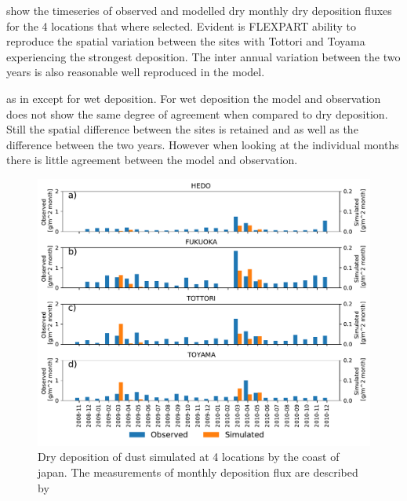  show the timeseries of observed and modelled dry monthly dry deposition fluxes for the 4 locations that where selected. Evident is FLEXPART ability to reproduce the spatial variation between the sites with Tottori and Toyama experiencing the strongest deposition. The inter annual variation between the two years is also reasonable well reproduced in the model. \par {} as in  except for wet deposition. For wet deposition the model and observation does not show the same degree of agreement when compared to dry deposition. Still the spatial difference between the sites is retained and as well as the difference between the two years. However when looking at the individual months there is little agreement between the model and observation.     

\begin{figure}[hptb]
    \centering
    \includegraphics[width=\textwidth]{texfiles/figs/monthly_accumulated_dry_depostion_japan.pdf}
    \caption{Dry deposition of dust simulated at 4 locations by the coast of japan. The measurements of monthly deposition flux are described by \textcite{osada2014wet}}
    \label{fig:model_eval_dry_deposition}
\end{figure}

